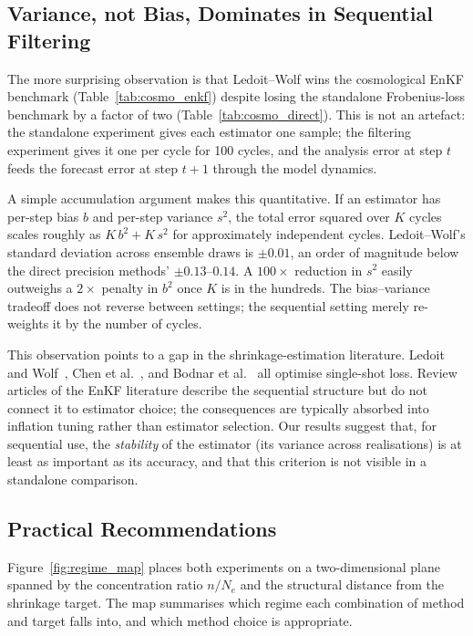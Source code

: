 \subsection{Variance, not Bias, Dominates in Sequential Filtering}
\label{sec:disc_variance}

The more surprising observation is that Ledoit--Wolf wins the cosmological EnKF benchmark (Table~\ref{tab:cosmo_enkf}) despite losing the standalone Frobenius-loss benchmark by a factor of two (Table~\ref{tab:cosmo_direct}). This is not an artefact: the standalone experiment gives each estimator one sample; the filtering experiment gives it one per cycle for 100 cycles, and the analysis error at step $t$ feeds the forecast error at step $t+1$ through the model dynamics.

A simple accumulation argument makes this quantitative. If an estimator has per-step bias $b$ and per-step variance $s^2$, the total error squared over $K$ cycles scales roughly as $K\,b^2 + K\,s^2$ for approximately independent cycles. Ledoit--Wolf's standard deviation across ensemble draws is $\pm 0.01$, an order of magnitude below the direct precision methods' $\pm 0.13$--$0.14$. A $100\times$ reduction in $s^2$ easily outweighs a $2\times$ penalty in $b^2$ once $K$ is in the hundreds. The bias--variance tradeoff does not reverse between settings; the sequential setting merely re-weights it by the number of cycles.

This observation points to a gap in the shrinkage-estimation literature. Ledoit and Wolf~\cite{ledoit2004well}, Chen et al.~\cite{chen2010shrinkage}, and Bodnar et al.~\cite{bodnar2016direct} all optimise single-shot loss. Review articles of the EnKF literature describe the sequential structure but do not connect it to estimator choice; the consequences are typically absorbed into inflation tuning rather than estimator selection. Our results suggest that, for sequential use, the \emph{stability} of the estimator (its variance across realisations) is at least as important as its accuracy, and that this criterion is not visible in a standalone comparison.

\subsection{Practical Recommendations}
\label{sec:disc_recommendations}

Figure~\ref{fig:regime_map} places both experiments on a two-dimensional plane spanned by the concentration ratio $n/N_e$ and the structural distance from the shrinkage target. The map summarises which regime each combination of method and target falls into, and which method choice is appropriate.

